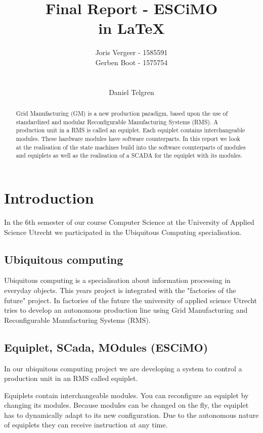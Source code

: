 \documentclass[12pt,a4paper]{report}
\title{
Final Report - ESCiMO \\
in \LaTeX{}
}
\author{
Joris Vergeer - 1585591\\
Gerben Boot - 1575754\\
\\
\\
Daniel Telgren
}
\begin{document}
\maketitle

\begin{abstract}
Grid Manufacturing (GM) is a new production paradigm, based upon the use of standardized and modular Reconfigurable Manufacturing Systems (RMS).\cite{SICE13}
A production unit in a RMS is called an equiplet.
Each equiplet contains interchangeable modules. 
These hardware modules have software counterparts.
In this report we look at the realisation of the state machines build into the software counterparts of modules and equiplets as well as the realisation of a SCADA for the equiplet with its modules.
\end{abstract}

\tableofcontents

\chapter{Introduction}
In the 6th semester of our course Computer Science at the University of Applied Science Utrecht we participated in the Ubiquitous Computing specialisation.

\section{Ubiquitous computing}
Ubiquitous computing is a specialisation about information processing in everyday objects.\cite{wiki_ubicomp}
This years project is integrated with the "factories of the future" project.\cite{ubi_project_note}
In factories of the future the university of applied science Utrecht tries to develop an autonomous production line using Grid Manufacturing and Reconfigurable Manufacturing Systems (RMS).

\section{Equiplet, SCada, MOdules (ESCiMO)}
In our ubiquitous computing project we are developing a system to control a production unit in an RMS called equiplet. 

Equiplets contain interchangeable modules. 
You can reconfigure an equiplet by changing its modules.
Because modules can be changed on the fly, the equiplet has to dynamically adapt to its new configuration.
Due to the autonomous nature of equiplets they can receive instruction at any time.
\end{document}
